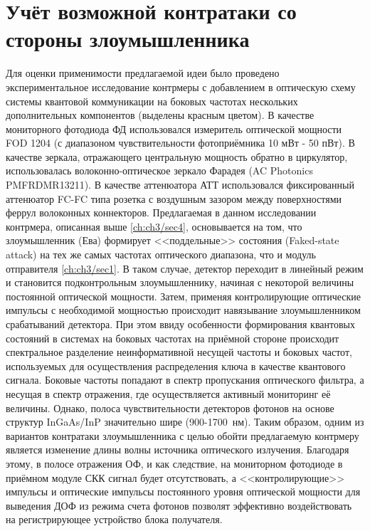 \pagebreak


\section{Учёт возможной контратаки со стороны злоумышленника}\label{ch:ch3/sec7}

Для оценки применимости предлагаемой идеи было проведено экспериментальное исследование контрмеры с добавлением в оптическую схему системы квантовой коммуникации на боковых частотах нескольких дополнительных компонентов (выделены красным цветом). В качестве мониторного фотодиода ФД использовался измеритель оптической мощности FOD 1204 (с диапазоном чувствительности фотоприёмника 10 мВт - 50 пВт). В качестве зеркала, отражающего центральную мощность обратно в циркулятор, использовалась волоконно-оптическое зеркало Фарадея (AC Photonics PMFRDMR13211). В качестве аттенюатора АТТ использовался фиксированный аттенюатор FC-FC типа розетка с воздушным зазором между поверхностями феррул волоконных коннекторов. Предлагаемая в данном исследовании контрмера, описанная выше \ref{ch:ch3/sec4}, основывается на том, что злоумышленник (Ева) формирует <<поддельные>> состояния (Faked-state attack) на тех же самых частотах оптического диапазона, что и модуль отправителя \ref{ch:ch3/sec1}. В таком случае, детектор переходит в линейный режим и становится подконтрольным злоумышленнику, начиная с некоторой величины постоянной оптической мощности. Затем, применяя контролирующие оптические импульсы с необходимой мощностью происходит навязывание злоумышленником срабатываний детектора. При этом ввиду особенности формирования квантовых состояний в системах на боковых частотах на приёмной стороне происходит спектральное разделение неинформативной несущей частоты и боковых частот, используемых для осуществления распределения ключа в качестве квантового сигнала. Боковые частоты попадают в спектр пропускания оптического фильтра, а несущая в спектр отражения, где осуществляется активный мониторинг её величины. Однако, полоса чувствительности детекторов фотонов на основе структур InGaAs/InP значительно шире (900-1700~нм). Таким образом, одним из вариантов контратаки злоумышленника с целью обойти предлагаемую контрмеру является изменение длины волны источника оптического излучения. Благодаря этому, в полосе отражения ОФ, и как следствие, на мониторном фотодиоде в приёмном модуле СКК сигнал будет отсутствовать, а <<контролирующие>> импульсы и оптические импульсы постоянного уровня оптической мощности для выведения ДОФ из режима счета фотонов позволят эффективно воздействовать на регистрирующее устройство блока получателя.

